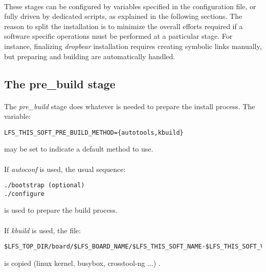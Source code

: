 \documentclass[a4paper, 11pt]{article}
\begin{document}
\paragraph{}
These stages can be configured by variables specified in the configuration file,
or fully driven by dedicated scripts, as explained in the following sections.
The reason to split the installation is to minimize the overall efforts required
if a software specific operations must be performed at a particular stage. For
instance, finalizing \textit{dropbear} installation requires creating symbolic
links manually, but preparing and building are automatically handled.

\subsection{The pre\_build stage}
\paragraph{}
The \textit{pre\_build} stage does whatever is needed to prepare the install
process. The variable:\\

\begin{lstlisting}[frame=tb]
LFS_THIS_SOFT_PRE_BUILD_METHOD={autotools,kbuild}
\end{lstlisting}
may be set to indicate a default method to use.

\paragraph{}
If \textit{autoconf} is used, the usual sequence:\\

\begin{lstlisting}[frame=tb]
./bootstrap (optional)
./configure
\end{lstlisting}
is used to prepare the build process.

\paragraph{}
If \textit{kbuild} is used, the file:\\

\begin{small}
\begin{lstlisting}[frame=tb]
$LFS_TOP_DIR/board/$LFS_BOARD_NAME/$LFS_THIS_SOFT_NAME-$LFS_THIS_SOFT_VERS.config
\end{lstlisting}
\end{small}
is copied (linux kernel, busybox, crosstool-ng ...) .
\end{document}
